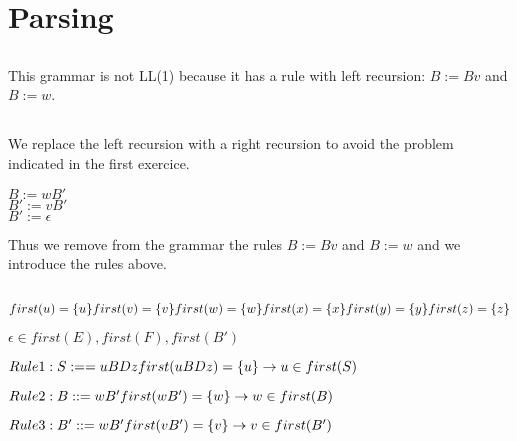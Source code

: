 \label{parsing}
\section{Parsing}
\subsection{}
 This grammar is not LL(1) because it has a rule with left recursion: $B:=Bv$ and $B:=w$.\\
\subsection{}
We replace the left recursion with a right recursion to avoid the problem indicated in the first exercice.\\
\begin{center}            
	$B:=wB'$\\
        $B':=vB'$\\
        $B':=\epsilon$\\
\end{center}
Thus we remove from the grammar the rules $B:=Bv$ and $B:=w$ and we introduce the rules above.\\
\subsection{}
$first(u) = \{u\}\\
            first(v) = \{v\}\\
            first(w) = \{w\}\\
            first(x) = \{x\}\\
            first(y) = \{y\}\\
            first(z) = \{z\}$
                
            $\epsilon \in first(E), first(F), first(B')$

            $Rule 1: S:== uBDz\\
            first(uBDz) = \{u\}\\
            \rightarrow u \in first(S)$
            
            $Rule 2: B::=wB'\\
            first(wB')=\{w\}\\
            \rightarrow w\in first(B)$
            
            $Rule 3: B'::= wB'\\
            first(vB') = \{v\}\\
            \rightarrow v \in first(B')$
            

